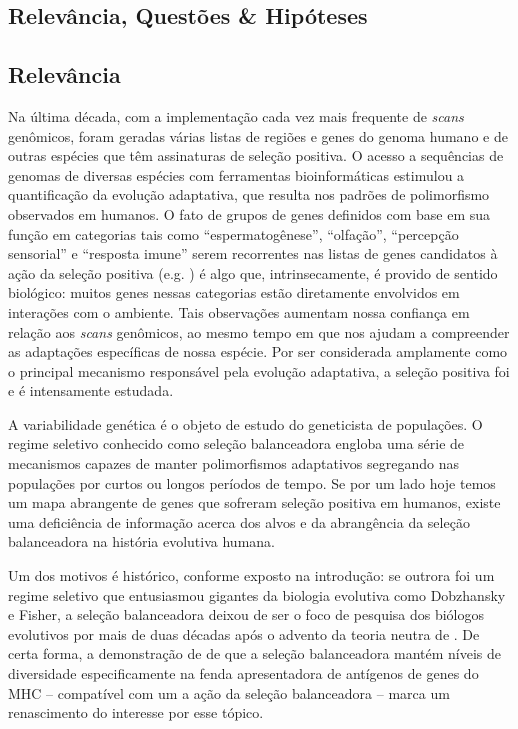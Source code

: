 \begin{refsection}
\section{Relevância, Questões \& Hipóteses}%
%
\subsection{Relevância}

Na última década, com a implementação cada vez mais frequente de \emph{scans} genômicos, foram geradas várias listas de regiões e genes do genoma humano e de outras espécies que têm assinaturas de seleção positiva. O acesso a sequências de genomas de diversas espécies com ferramentas bioinformáticas estimulou a quantificação da evolução adaptativa, que resulta nos padrões de polimorfismo observados em humanos. O fato de grupos de genes definidos com base em sua função em categorias tais como \enquote{espermatogênese}, \enquote{olfação}, \enquote{percepção sensorial} e \enquote{resposta imune} serem recorrentes nas listas de genes candidatos à ação da seleção positiva (e.g. \cite{Nielsen2005,Sabeti2006}) é algo que, intrinsecamente, é provido de sentido biológico: muitos genes nessas categorias estão diretamente envolvidos em interações com o ambiente. Tais observações aumentam nossa confiança em relação aos \emph{scans} genômicos, ao mesmo tempo em que nos ajudam a compreender as adaptações específicas de nossa espécie. Por ser considerada amplamente como o principal mecanismo responsável pela evolução adaptativa, a seleção positiva foi e é intensamente estudada. 


%


A variabilidade genética é o objeto de estudo do geneticista de populações. O regime seletivo conhecido como seleção balanceadora engloba uma série de mecanismos capazes de manter polimorfismos adaptativos segregando nas populações por curtos ou longos períodos de tempo. Se por um lado hoje temos um mapa abrangente de genes que sofreram seleção positiva em humanos, existe uma deficiência de informação acerca dos alvos e da abrangência da seleção balanceadora na história evolutiva humana. 

Um dos motivos é histórico, conforme exposto na introdução: se outrora foi um regime seletivo que entusiasmou gigantes da biologia evolutiva como Dobzhansky e Fisher, a seleção balanceadora deixou de ser o foco de pesquisa dos biólogos evolutivos por mais de duas décadas após o advento da teoria neutra de \textcite{Kimura1968,Kimura1983}. De certa forma, a demonstração de \textcite{Hughes1988} de que a seleção balanceadora mantém níveis de diversidade especificamente na fenda apresentadora de antígenos de genes do MHC -- compatível com um a ação da seleção balanceadora -- marca um renascimento do interesse por esse tópico. 
%


\end{refsection}

